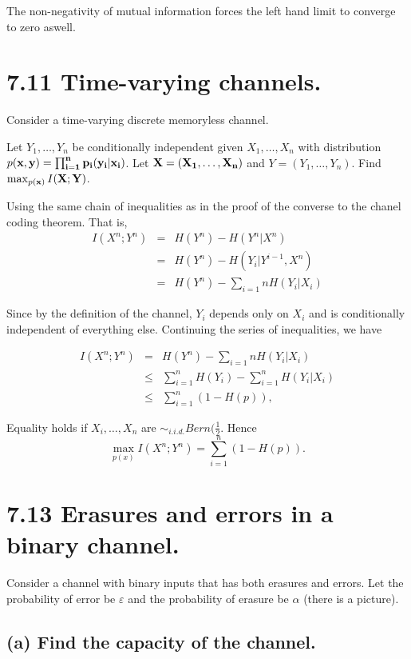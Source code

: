 \documentclass[12pt]{article}
\begin{document}
\begin{tiny}
\begin{multicols}{2}
The non-negativity of mutual information forces the left hand limit to
converge to zero aswell.

\section*{7.11 Time-varying channels.}
Consider a time-varying discrete memoryless channel.

Let $Y_1,\dots,Y_n$ be conditionally independent given $X_1,\dots,X_n$ with distribution $p(\bf{x}, \bf{y}) = \prod_{i=1}^{n}p_i(y_i|x_i)$. Let $\bf{X} = (X_1,\dots,X_n)$ and $Y=(Y_1,\dots,Y_n)$. Find $\max_{p(\bf{x})} I(\bf{X};\bf{Y})$.

Using the same chain of inequalities as in the proof of the converse to the chanel coding theorem. That is,
\begin{eqnarray*}
    I(X^n;Y^n) &=& H(Y^n) - H(Y^n|X^n) \\
    &=& H(Y^n) - H(Y_i | Y^{i-1}, X^n) \\
    &=& H(Y^n) - \sum_{i=1}{n} H(Y_i | X_i)
\end{eqnarray*}

Since by the definition of the channel, $Y_i$ depends only on $X_i$ and is conditionally independent of everything else. Continuing the series of inequalities, we have

\begin{eqnarray*}
    I(X^n;Y^n) &=& H(Y^n) - \sum_{i=1}{n} H(Y_i | X_i) \\
    &\le& \sum_{i=1}^{n} H(Y_i) - \sum_{i=1}^{n}H(Y_i | X_i) \\
    &\le& \sum_{i=1}^{n} (1-H(p)),
\end{eqnarray*}

Equality holds if $X_i,\dots,X_n$ are $\sim_{i.i.d.} Bern(\frac{1}{2}$. Hence
\begin{equation*}
    \max_{p(x)} I(X^n; Y^n) = \sum_{i=1}^{n}(1-H(p)).
\end{equation*}

\section*{7.13 Erasures and errors in a binary channel.}
Consider a channel with binary inputs that has both erasures and errors. Let the probability of error be $\varepsilon$ and the probability of erasure be $\alpha$ (there is a picture).

\subsection*{(a) Find the capacity of the channel.}


\end{multicols}
\end{tiny}
\end{document}
